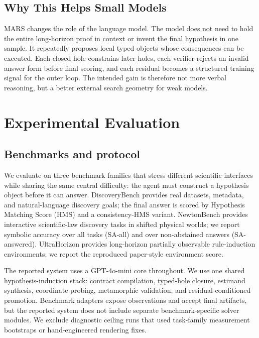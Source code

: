\documentclass[letterpaper]{article}
\newcommand{\mars}{\textsc{MARS}\xspace}
\newcommand{\gptmini}{GPT-4o-mini\xspace}
\begin{document}
\subsection{Why This Helps Small Models}

\mars changes the role of the language model. The model does not need to hold
the entire long-horizon proof in context or invent the final hypothesis in one
sample. It repeatedly proposes local typed objects whose consequences can be
executed. Each closed hole constrains later holes, each verifier rejects an
invalid answer form before final scoring, and each residual becomes a structured
training signal for the outer loop. The intended gain is therefore not more
verbal reasoning, but a better external search geometry for weak models.

\section{Experimental Evaluation}

\subsection{Benchmarks and protocol}

We evaluate on three benchmark families that stress different scientific
interfaces while sharing the same central difficulty: the agent must construct
a hypothesis object before it can answer. DiscoveryBench provides real
datasets, metadata, and natural-language discovery goals; the final answer is
scored by Hypothesis Matching Score (HMS) and a consistency-HMS variant.
NewtonBench provides interactive scientific-law discovery tasks in shifted
physical worlds; we report symbolic accuracy over all tasks (SA-all) and over
non-abstained answers (SA-answered). UltraHorizon provides long-horizon
partially observable rule-induction environments; we report the reproduced
paper-style environment score.

The reported system uses a \gptmini core throughout. We use one shared
hypothesis-induction stack: contract compilation, typed-hole closure,
estimand synthesis, coordinate probing, metamorphic validation, and
residual-conditioned promotion. Benchmark adapters expose observations and
accept final artifacts, but the reported system does not include separate
benchmark-specific solver modules. We exclude diagnostic ceiling runs that
used task-family measurement bootstraps or hand-engineered rendering fixes.
\end{document}
